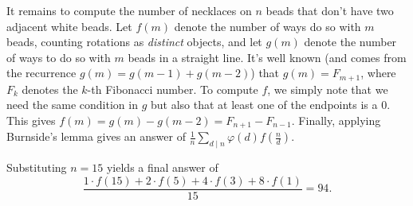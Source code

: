 \documentclass[10pt]{article}
\begin{document}
\begin{enumerate}
\par It remains to compute the number of necklaces on $n$ beads that don't have two adjacent white beads. Let $f(m)$ denote the number of ways do so with $m$ beads, counting rotations as \textit{distinct} objects, and let $g(m)$ denote the number of ways to do so with $m$ beads in a straight line. It's well known (and comes from the recurrence $g(m) = g(m-1) + g(m-2)$) that $g(m) = F_{m+1}$, where $F_k$ denotes the $k$-th Fibonacci number. To compute $f$, we simply note that we need the same condition in $g$ but also that at least one of the endpoints is a 0. This gives $f(m) = g(m) - g(m - 2) = F_{n+1} - F_{n-1}$. Finally, applying Burnside's lemma gives an answer of $\frac{1}{n} \sum_{d \mid n} \varphi(d) f(\frac{n}{d})$.

\par Substituting $n = 15$ yields a final answer of \[\frac{1\cdot f(15) + 2\cdot f(5) + 4\cdot f(3) + 8\cdot f(1)}{15} = \boxed{94}.\]

\end{enumerate}
\end{document}
